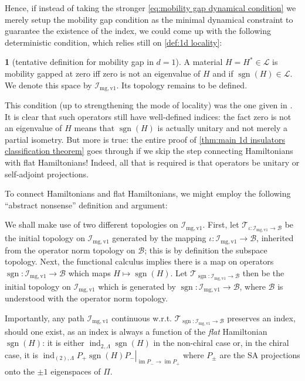 \documentclass[a4paper,10pt]{article}
\numberwithin{equation}{section}
\theoremstyle{plain}
\theoremstyle{plain}
\theoremstyle{plain}
\theoremstyle{plain}
\theoremstyle{plain}
\theoremstyle{remark}
\theoremstyle{definition}
\newtheorem{defn}[thm]{\protect\definitionname}
\theoremstyle{plain}
\providecommand{\definitionname}{Definition}
\newcommand{\calB}{\mathcal{B}}
\newcommand{\calL}{\mathcal{L}}
\newcommand{\calI}{\mathcal{I}}
\newcommand{\sgn}{\operatorname{sgn}}
\newcommand{\findex}{\operatorname{ind}}
\newcommand{\im}{\operatorname{im}}
\newcommand{\calT}{\mathcal{T}}
\begin{document}
	Hence, if instead of taking the stronger \cref{eq:mobility gap dynamical condition} we merely setup the mobility gap condition as the minimal dynamical constraint to guarantee the existence of the index, we could come up with the following deterministic condition, which relies still on \cref{def:1d locality}: 
	\begin{defn}[tentative definition for mobility gap in $d=1$] A material $H=H^\ast\in\calL$ is mobility gapped at zero iff zero is not an eigenvalue of $H$ and if $\sgn(H)\in\calL$. We denote this space by $\calI_{\mathrm{mg,v1}}$. Its topology remains to be defined.
	\end{defn}
	
	This condition (up to strengthening the mode of locality) was the one given in \cite[Assumptions 1 and 2]{Graf_Shapiro_2018_1D_Chiral_BEC}. It is clear that such operators still have well-defined indices: the fact zero is not an eigenvalue of $H$ means that $\sgn(H)$ is actually unitary and not merely a partial isometry. But more is true: the entire proof of \cref{thm:main 1d insulators classification theorem} goes through if we skip the step connecting Hamiltonians with flat Hamiltonians! Indeed, all that is required is that operators be unitary or self-adjoint projections. 
	
	To connect Hamiltonians and flat Hamiltonians, we might employ the following ``abstract nonsense'' definition and argument:
	
	We shall make use of two different topologies on $\calI_{\mathrm{mg,v1}}$. First, let $\calT_{\iota:\calI_{\mathrm{mg,v1}}\to\calB}$ be the initial topology on $\calI_{\mathrm{mg,v1}}$ generated by the mapping $\iota:\calI_{\mathrm{mg,v1}}\to\calB$, inherited from the operator norm topology on $\calB$; this is by definition the subspace topology. Next, the functional calculus implies there is a map on operators $\sgn:\calI_{\mathrm{mg,v1}}\to\calB$ which maps $H\mapsto\sgn(H)$. Let $\calT_{\sgn:\calI_{\mathrm{mg,v1}}\to\calB}$ then be the initial topology on $\calI_{\mathrm{mg,v1}}$ which is generated by $\sgn:\calI_{\mathrm{mg,v1}}\to\calB$, where $\calB$ is understood with the operator norm topology.
	
	Importantly, any path $\calI_{\mathrm{mg,v1}}$ continuous w.r.t. $\calT_{\sgn:\calI_{\mathrm{mg,v1}}\to\calB}$ preserves an index, should one exist, as an index is always a function of the \emph{flat} Hamiltonian $\sgn(H)$: it is either $\findex_{2,\Lambda}\sgn(H)$ in the non-chiral case or, in the chiral case, it is $\findex_{(2),\Lambda}\left.P_{+} \sgn(H) P_{-}\right|_{\im P_-\to\im P_+}$ where $P_{\pm}$ are the SA projections onto the $\pm1$ eigenspaces of $\Pi$.
	
\end{document}
